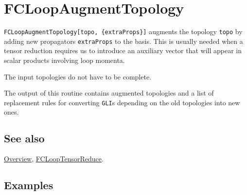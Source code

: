 \documentclass[../FeynCalcManual.tex]{subfiles}
\begin{document}
\hypertarget{fcloopaugmenttopology}{
\section{FCLoopAugmentTopology}\label{fcloopaugmenttopology}}

\texttt{FCLoopAugmentTopology[\allowbreak{}topo,\ \allowbreak{}\{\allowbreak{}extraProps\}]}
augments the topology \texttt{topo} by adding new propagators
\texttt{extraProps} to the basis. This is usually needed when a tensor
reduction requires us to introduce an auxiliary vector that will appear
in scalar products involving loop momenta.

The input topologies do not have to be complete.

The output of this routine contains augmented topologies and a list of
replacement rules for converting \texttt{GLI}s depending on the old
topologies into new ones.

\subsection{See also}

\hyperlink{toc}{Overview},
\hyperlink{fclooptensorreduce}{FCLoopTensorReduce}.

\subsection{Examples}

\begin{Shaded}
\begin{Highlighting}[]
\ExtensionTok{=}\OperatorTok{[}\OperatorTok{,} \OperatorTok{\{}\OperatorTok{[\{}\OperatorTok{,} \SpecialCharTok{\^{}}\OperatorTok{\}],}\OperatorTok{[\{}\SpecialCharTok{+}\OperatorTok{\}],} 
\OperatorTok{[\{}\SpecialCharTok{+}\OperatorTok{\}]\},} \OperatorTok{\{}\OperatorTok{\},} \OperatorTok{\{}\OperatorTok{,}\OperatorTok{\},} \OperatorTok{\{}\OperatorTok{[}\OperatorTok{][}\OperatorTok{]} \OtherTok{{-}\textgreater{}} \OperatorTok{,} \OperatorTok{[}\OperatorTok{][}\OperatorTok{]} \OtherTok{{-}\textgreater{}} \OperatorTok{,} 
    \OperatorTok{[}\OperatorTok{][}\OperatorTok{,}\OperatorTok{]} \OtherTok{{-}\textgreater{}} \OperatorTok{\},} \OperatorTok{\{\}]}
\end{Highlighting}
\end{Shaded}
\end{document}
